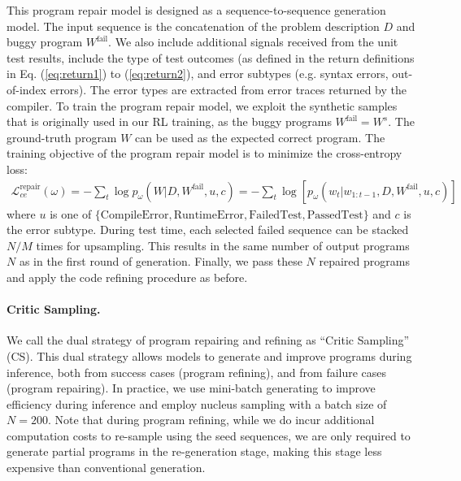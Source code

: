 \documentclass{article}
\begin{document}
This program repair model is designed as a sequence-to-sequence generation model.
The input sequence is the concatenation of the problem description $D$ and buggy program $W^\mathrm{fail}$. 
We also include additional signals received from the unit test results, include the type of test outcomes (as defined in the return definitions in Eq. (\ref{eq:return1}) to (\ref{eq:return2}), and error subtypes (e.g. syntax errors, out-of-index errors).
The error types are extracted from error traces returned by the compiler.
To train the program repair model, we exploit the synthetic samples that is originally used in our RL training,
as the buggy programs $W^\mathrm{fail}=W^{s}$.
The ground-truth program $W$ can be used as the expected correct program. 
The training objective of the program repair model is to minimize the cross-entropy loss: 
\begin{align}
    \mathcal{L}^\mathrm{repair}_{ce}(\omega) = - \sum_t \log p_\omega(W|D, W^\mathrm{fail}, u, c) = - \sum_t \log [p_\omega (w_t | w_{1:t-1}, D, W^\mathrm{fail}, u, c)]
\end{align}
where $u$ is one of $\{\mathrm{CompileError, RuntimeError, FailedTest, PassedTest}\}$ and $c$ is the error subtype.
During test time, each selected failed sequence can be stacked $N/M$ times for upsampling.
This results in the same number of output programs $N$ as in the first round of generation.
Finally, we pass these $N$ repaired programs and apply the code refining procedure as before. 

\paragraph{Critic Sampling.}
We call the dual strategy of program repairing and refining as ``Critic Sampling'' (CS). 
This dual strategy allows models to generate and improve programs during inference, both from success cases (program refining), and from failure cases (program repairing). 
In practice, we use mini-batch generating to improve efficiency during inference and employ nucleus sampling with a batch size of $N=200$. 
Note that during program refining, while we do incur additional computation costs to re-sample using the seed sequences, we are only required to generate partial programs in the re-generation stage, making this stage less expensive than conventional generation.
\end{document}

